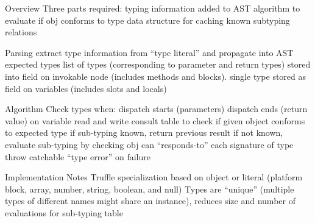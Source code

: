 \begin{outline}

\1 Overview
    \2 Three parts required:
        \3 typing information added to AST
        \3 algorithm to evaluate if obj conforms to type
        \3 data structure for caching known subtyping relations

\1 Parsing
    \2 extract type information from ``type literal'' and propagate into AST 
    \2 expected types 
        \3 list of types (corresponding to parameter and return types) stored into field on invokable node (includes methods and blocks). 
        \3 single type stored as field on variables (includes slots and locals)

\1 Algorithm
    \2 Check types when:
        \3 dispatch starts (parameters)
        \3 dispatch ends (return value)
        \3 on variable read and write 
    \2 consult table to check if given object conforms to expected type
        \3 if sub-typing known, return previous result
        \3 if not known, evaluate sub-typing by checking obj can ``responds-to'' each signature of type
    \2 throw catchable ``type error'' on failure 

\1 Implementation Notes
    \2 Truffle specialization based on object or literal (platform block, array, number, string, boolean, and null)
    \2 Types are ``unique'' (multiple types of different names might share an instance), reduces size and number of evaluations for sub-typing table

\end{outline}